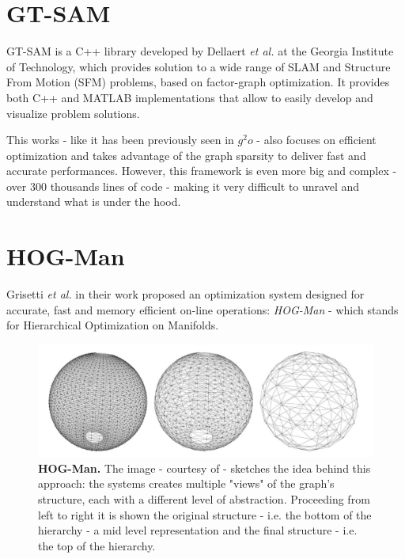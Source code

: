 \section{GT-SAM}\label{sec:gtsam}
GT-SAM is a C++ library developed by Dellaert \textit{et al.} \cite{dellaert2012gtsam} at the Georgia Institute of Technology, which provides solution to a wide range of SLAM and Structure From Motion (SFM) problems, based on factor-graph optimization. It provides both C++ and MATLAB implementations that allow to easily develop and visualize problem solutions. 

This works - like it has been previously seen in $g^2o$ - also focuses on efficient optimization and takes advantage of the graph sparsity to deliver fast and accurate performances. However, this framework is even more big and complex - over 300 thousands lines of code - making it very difficult to unravel and understand what is under the hood.

\section{HOG-Man}\label{sec:hogman}
Grisetti \textit{et al.} in their work \cite{grisetti2010hogman} proposed an optimization system designed for accurate, fast and memory efficient on-line operations: \textit{HOG-Man} - which stands for Hierarchical Optimization on Manifolds.

\begin{figure}[!hbt]
    \centering
    \includegraphics[width=\textwidth]{figures/01_related/hogman.png}
    \caption{\textbf{HOG-Man.} The image - courtesy of \cite{grisetti2010hogman} - sketches the idea behind this approach: the systems creates multiple "views" of the graph's structure, each with a different level of abstraction. Proceeding from left to right it is shown the original structure - i.e. the bottom of the hierarchy - a mid level representation and the final structure - i.e. the top of the hierarchy.} 
    \label{fig:hogman}
\end{figure}

